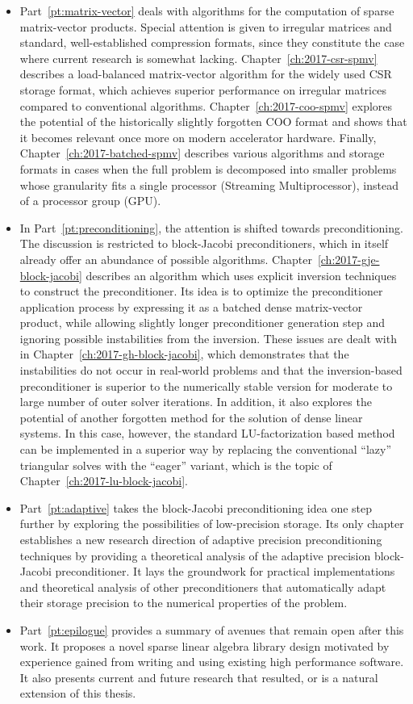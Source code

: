 \begin{itemize}
\item Part~\ref{pt:matrix-vector} deals with algorithms for the computation of
sparse matrix-vector products. Special attention is given to irregular matrices
and standard, well-established compression formats, since they constitute the
case where current research is somewhat lacking. Chapter~\ref{ch:2017-csr-spmv}
describes a load-balanced matrix-vector algorithm for the widely used CSR
storage format, which achieves superior performance on irregular matrices
compared to conventional algorithms. Chapter~\ref{ch:2017-coo-spmv} explores the
potential of the historically slightly forgotten COO format and shows that it
becomes relevant once more on modern accelerator hardware. Finally,
Chapter~\ref{ch:2017-batched-spmv} describes various algorithms and storage
formats in cases when the full problem is decomposed into smaller problems whose
granularity fits a single processor (\ie Streaming Multiprocessor), instead of a
processor group (\ie GPU).
\item In Part~\ref{pt:preconditioning}, the attention is shifted towards
preconditioning. The discussion is restricted to block-Jacobi preconditioners,
which in itself already offer an abundance of possible algorithms.
Chapter~\ref{ch:2017-gje-block-jacobi} describes an algorithm which uses
explicit inversion techniques to construct the preconditioner. Its idea is to
optimize the preconditioner application process by expressing it as a batched
dense matrix-vector product, while allowing slightly longer preconditioner
generation step and ignoring possible instabilities from the inversion. These
issues are dealt with in Chapter~\ref{ch:2017-gh-block-jacobi}, which
demonstrates that the instabilities do not occur in real-world problems and that
the inversion-based preconditioner is superior to the numerically stable version
for moderate to large number of outer solver iterations. In addition, it also
explores the potential of another forgotten method for the solution of dense
linear systems. In this case, however, the standard LU-factorization based
method can be implemented in a superior way by replacing the conventional
``lazy'' triangular solves with the ``eager'' variant, which is the topic of
Chapter~\ref{ch:2017-lu-block-jacobi}.
\item Part~\ref{pt:adaptive} takes the block-Jacobi preconditioning idea one
step further by exploring the possibilities of low-precision storage. Its only
chapter establishes a new research direction of adaptive precision
preconditioning techniques by providing a theoretical analysis of the adaptive
precision block-Jacobi preconditioner. It lays the groundwork for practical
implementations and theoretical analysis of other preconditioners that
automatically adapt their storage precision to the numerical properties of the
problem.
\item Part~\ref{pt:epilogue} provides a summary of avenues that remain open
after this work. It proposes a novel sparse linear algebra library design
motivated by experience gained from writing and using existing high performance
software. It also presents current and future research that resulted, or is a
natural extension of this thesis.
\end{itemize}
